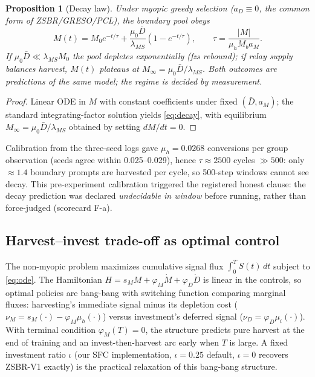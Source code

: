 \documentclass[11pt]{article}
\newtheorem{proposition}[theorem]{Proposition}
\theoremstyle{definition}
\begin{document}
\begin{proposition}[Decay law]\label{prop:decay}
Under myopic greedy selection ($a_D\equiv0$, the common form of
ZSBR/GRESO/PCL), the boundary pool obeys
\begin{equation}\label{eq:decay}
M(t) = M_0 e^{-t/\tau} + \frac{\mu_0 \bar D}{\lambda_{MS}}\left(1-e^{-t/\tau}\right),
\qquad \tau = \frac{|M|}{\mu_h M_b a_M}.
\end{equation}
If $\mu_0 \bar D \ll \lambda_{MS} M_0$ the pool depletes exponentially (fzs
rebound); if relay supply balances harvest, $M(t)$ plateaus at
$M_\infty=\mu_0\bar D/\lambda_{MS}$. \emph{Both outcomes are predictions of the
same model}; the regime is decided by measurement.
\end{proposition}
\begin{proof}
Linear ODE in $M$ with constant coefficients under fixed $(\bar D, a_M)$;
the standard integrating-factor solution yields \eqref{eq:decay}, with equilibrium
$M_\infty=\mu_0\bar D/\lambda_{MS}$ obtained by setting $dM/dt=0$.
\end{proof}
Calibration from the three-seed logs gave $\mu_h{=}0.0268$ conversions per group
observation (seeds agree within 0.025--0.029), hence $\tau\approx2500$ cycles
$\gg500$: only ${\approx}1.4$ boundary prompts are harvested per cycle, so
500-step windows cannot see decay. This pre-experiment calibration triggered the
registered honest clause: the decay prediction was declared \emph{undecidable in
window} before running, rather than force-judged (scorecard F-a).

\subsection{Harvest--invest trade-off as optimal control}\label{sec:l3-control}
The non-myopic problem maximizes cumulative signal flux
$\int_0^T S(t)\,dt$ subject to \eqref{eq:ode}. The Hamiltonian
$H = s_M M + \varphi_M \dot M + \varphi_D \dot D$ is linear in the controls, so
optimal policies are bang-bang with switching function comparing marginal fluxes:
harvesting's immediate signal minus its depletion cost
($\nu_M = s_M(\cdot) - \varphi_M\mu_h(\cdot)$) versus investment's deferred signal
($\nu_D = \varphi_D\mu_i(\cdot)$). With terminal condition $\varphi_M(T){=}0$, the
structure predicts pure harvest at the end of training and an invest-then-harvest
arc early when $T$ is large. A fixed investment ratio $\iota$ (our SFC
implementation, $\iota{=}0.25$ default, $\iota{=}0$ recovers ZSBR-V1 exactly) is
the practical relaxation of this bang-bang structure.
\end{document}
